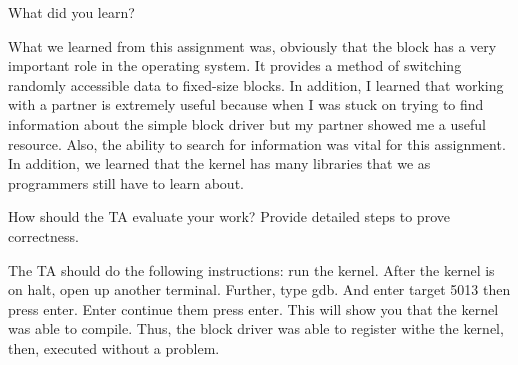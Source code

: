 \documentclass{article}
\newenvironment{question}[2][Question]{\begin{trivlist}
\item[\hskip \labelsep {\bfseries #1}\hskip \labelsep {\bfseries #2.}]}{\end{trivlist}}
\begin{document}
\vspace{0.25in}
\begin{question}{4}
What did you learn?
\end{question}
What we learned from this assignment was, obviously that the block has a very important role in the operating system. It provides a method of switching randomly accessible data to fixed-size blocks. In addition, I learned that working with a partner is extremely useful because when I was stuck on trying to find information about the simple block driver but my partner showed me a useful resource. Also, the ability to search for information was vital for this assignment. In addition, we learned that the kernel has many libraries that we as programmers still have to learn about. 




\vspace{0.25in}
\begin{question}{5}
How should the TA evaluate your work? Provide detailed steps to prove correctness.
\end{question}
The TA should do the following instructions: run the kernel. After the kernel is on halt, open up another terminal. Further, type gdb. And enter target 5013 then press enter. Enter continue them press enter. This will show you that the kernel was able to compile. Thus, the block driver was able to register withe the kernel, then, executed without a problem. 



\end{document}
